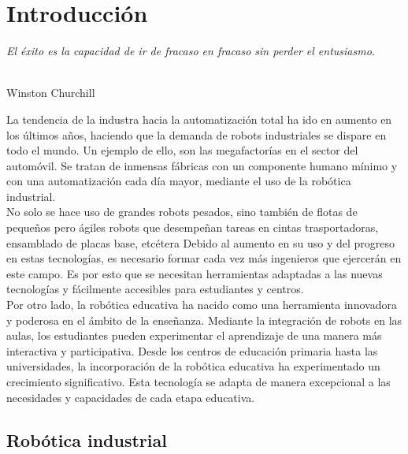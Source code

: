 \chapter{Introducción}
\label{cap:capitulo1}
\setcounter{page}{1}

\begin{flushright}
\begin{minipage}[]{10cm}
\emph{El éxito es la capacidad de ir de fracaso en fracaso sin perder el entusiasmo.}\\
\end{minipage}\\

Winston Churchill\\
\end{flushright}

\vspace{1cm}

La tendencia de la industra hacia la automatización total ha ido en aumento en los últimos años, 
haciendo que la demanda de robots industriales se dispare en todo el mundo. Un ejemplo de ello, son 
las megafactorías en el sector del automóvil. Se tratan de inmensas fábricas con un componente humano
mínimo y con una automatización cada día mayor, mediante el uso de la robótica industrial. \\No solo se hace
uso de grandes robots pesados, sino también de flotas de pequeños pero ágiles robots que desempeñan tareas
en cintas trasportadoras, ensamblado de placas base, etcétera  Debido al aumento en su uso y del progreso 
en estas tecnologías, es necesario formar cada vez más ingenieros que ejercerán en este campo. Es por esto que se 
necesitan herramientas adaptadas a las nuevas tecnologías y fácilmente accesibles para estudiantes y centros.    \\
Por otro lado, la robótica educativa ha nacido como una herramienta innovadora y poderosa en el ámbito de la 
enseñanza. Mediante la integración de robots en las aulas, los estudiantes pueden experimentar el 
aprendizaje de una manera más interactiva y participativa. Desde los centros de educación primaria hasta las 
universidades, la incorporación de la robótica educativa ha experimentado un crecimiento significativo. Esta 
tecnología se adapta de manera excepcional a las necesidades y capacidades de cada etapa educativa.

\section{Robótica industrial}
\label{sec:miseccion} %

